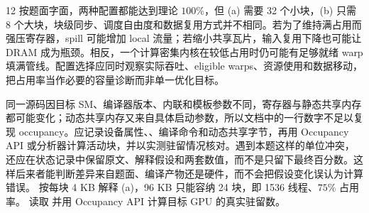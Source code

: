 \begin{solutionexercise}{12}
按题面字面，两种配置都能达到理论 $100\%$，但 (a) 需要 32 个小块，(b) 只需 8 个大块，块级同步、调度自由度和数据复用方式并不相同。若为了维持满占用而强压寄存器，spill 可能增加 local 流量；若缩小共享瓦片，输入复用下降也可能让 DRAM 成为瓶颈。相反，一个计算密集内核在较低占用时仍可能有足够就绪 warp 填满管线。配置选择应同时观察实际吞吐、eligible warps、资源使用和数据移动，把占用率当作必要的容量诊断而非单一优化目标。

同一源码因目标 SM、编译器版本、内联和模板参数不同，寄存器与静态共享内存都可能变化；动态共享内存又来自具体启动参数，所以文档中的一行数字不足以复现 occupancy。应记录设备属性、、编译命令和动态共享字节，再用 Occupancy API 或分析器计算活动块，并以实测驻留情况核对。遇到本题这样的单位冲突，还应在状态记录中保留原文、解释假设和两套数值，而不是只留下最终百分数。这样后来者能判断差异来自题面、编译产物还是硬件，而不会把假设变化误认为计算错误。
\variantheading 按每块 4 KB 解释 (a)，96 KB 只能容纳 24 块，即 1536 线程、$75\%$ 占用率。
\practiceheading 读取  并用 Occupancy API 计算目标 GPU 的真实驻留数。
\end{solutionexercise}
